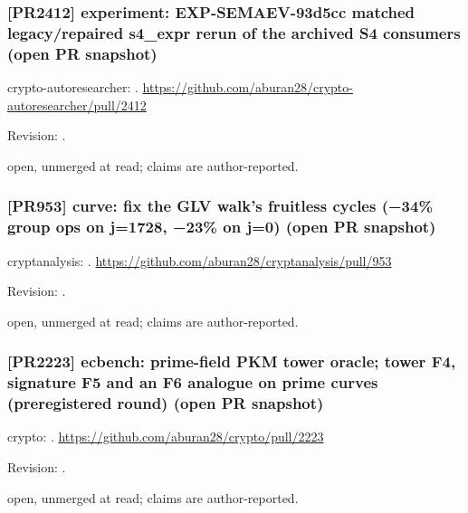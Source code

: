 \par\noindent\begin{minipage}{\linewidth}\small
\subsubsection*{[PR2412] experiment: EXP-SEMAEV-93d5cc matched legacy/repaired s4\_expr rerun of the archived S4 consumers (open PR snapshot)}\label{art:PR2412}
crypto-autoresearcher: .
\url{https://github.com/aburan28/crypto-autoresearcher/pull/2412}
\par Revision: .
\par open, unmerged at read; claims are author-reported.
\end{minipage}\par\medskip

\par\noindent\begin{minipage}{\linewidth}\small
\subsubsection*{[PR953] curve: fix the GLV walk's fruitless cycles (−34\% group ops on j=1728, −23\% on j=0) (open PR snapshot)}\label{art:PR953}
cryptanalysis: .
\url{https://github.com/aburan28/cryptanalysis/pull/953}
\par Revision: .
\par open, unmerged at read; claims are author-reported.
\end{minipage}\par\medskip

\par\noindent\begin{minipage}{\linewidth}\small
\subsubsection*{[PR2223] ecbench: prime-field PKM tower oracle; tower F4, signature F5 and an F6 analogue on prime curves (preregistered round) (open PR snapshot)}\label{art:PR2223}
crypto: .
\url{https://github.com/aburan28/crypto/pull/2223}
\par Revision: .
\par open, unmerged at read; claims are author-reported.
\end{minipage}\par\medskip

